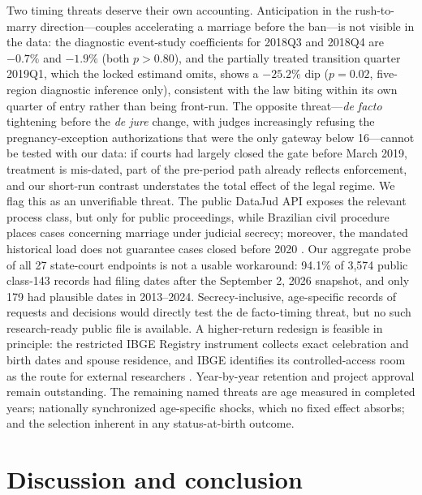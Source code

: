 \documentclass[12pt]{article}
\begin{document}
Two timing threats deserve their own accounting. Anticipation in the rush-to-marry
direction---couples accelerating a marriage before the ban---is not visible in the
data: the diagnostic event-study coefficients for 2018Q3 and 2018Q4 are $-0.7\%$ and
$-1.9\%$ (both $p>0.80$), and the partially treated transition quarter 2019Q1, which
the locked estimand omits, shows a $-25.2\%$ dip ($p=0.02$, five-region diagnostic
inference only), consistent with the law biting within its own quarter of entry rather
than being front-run. The opposite threat---\emph{de facto} tightening before the
\emph{de jure} change, with judges increasingly refusing the pregnancy-exception
authorizations that were the only gateway below 16---cannot be tested with our data:
if courts had largely closed the gate before March 2019, treatment is mis-dated, part
of the pre-period path already reflects enforcement, and our short-run contrast
understates the total effect of the legal regime. We flag this as an unverifiable
threat. The public DataJud API exposes the relevant process class, but only for public
proceedings, while Brazilian civil procedure places cases concerning marriage under
judicial secrecy; moreover, the mandated historical load does not guarantee cases closed
before 2020 \citep{CNJDataJudAPI,CodigoProcessoCivil2015,CNJResolution331}. Our
aggregate probe of all 27 state-court endpoints is not a usable workaround: 94.1\% of
3,574 public class-143 records had filing dates after the September 2, 2026 snapshot,
and only 179 had plausible dates in 2013--2024. Secrecy-inclusive, age-specific records
of requests and decisions would directly test the de facto-timing threat, but no such
research-ready public file is available. A higher-return redesign is feasible in
principle: the restricted IBGE Registry instrument collects exact celebration and birth
dates and spouse residence, and IBGE identifies its controlled-access room as the route
for external researchers \citep{IBGERegistryInstrument,IBGEConfidentiality2018}.
Year-by-year retention and project approval remain outstanding. The remaining named threats
are age measured in completed years; nationally synchronized age-specific shocks, which
no fixed effect absorbs; and the selection inherent in any status-at-birth outcome.

\section{Discussion and conclusion}\label{sec:conclusion}
\end{document}
